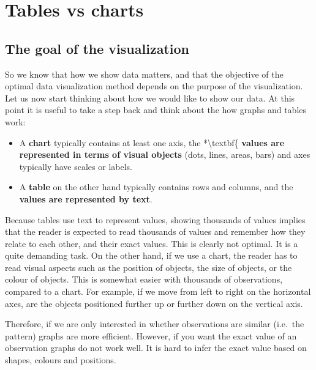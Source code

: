 \documentclass[
]{book}
\providecommand{\tightlist}{%
  \setlength{\itemsep}{0pt}\setlength{\parskip}{0pt}}
\begin{document}
\hypertarget{tables-vs-charts}{%
\section{Tables vs charts}\label{tables-vs-charts}}

\hypertarget{the-goal-of-the-visualization}{%
\subsection*{The goal of the visualization}\label{the-goal-of-the-visualization}}

So we know that how we show data matters, and that the objective of the optimal data visualization method depends on the purpose of the visualization. Let us now start thinking about how we would like to show our data. At this point it is useful to take a step back and think about the how graphs and tables work:

\begin{itemize}
\tightlist
\item
  A \textbf{chart} typically contains at least one axis, the *\textbackslash textbf\{\textbf{ values are represented in terms of visual objects} (dots, lines, areas, bars) and axes typically have scales or labels.
\item
  A \textbf{table} on the other hand typically contains rows and columns, and the \textbf{values are represented by text}.
\end{itemize}

Because tables use text to represent values, showing thousands of values implies that the reader is expected to read thousands of values and remember how they relate to each other, and their exact values. This is clearly not optimal. It is a quite demanding task. On the other hand, if we use a chart, the reader has to read visual aspects such as the position of objects, the size of objects, or the colour of objects. This is somewhat easier with thousands of observations, compared to a chart. For example, if we move from left to right on the horizontal axes, are the objects positioned further up or further down on the vertical axis.

Therefore, if we are only interested in whether observations are similar (i.e.~the pattern) graphs are more efficient. However, if you want the exact value of an observation graphs do not work well. It is hard to infer the exact value based on shapes, colours and positions.
\end{document}
